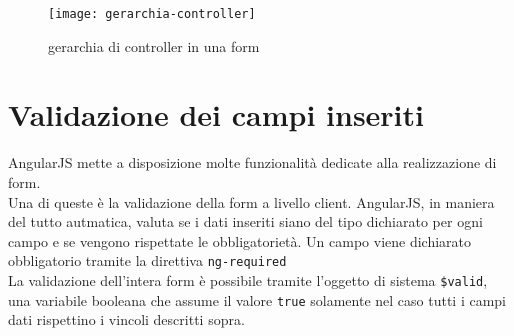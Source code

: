 	\begin{figure}[h]
	\centering
	\texttt{[image: gerarchia-controller]}
	\caption{gerarchia di controller in una form}
	\label{fig:ger-contr}
\end{figure}

\section{Validazione dei campi inseriti}

AngularJS mette a disposizione molte funzionalità dedicate alla realizzazione di form.\\
Una di queste è la validazione della form a livello client. AngularJS, in maniera del tutto autmatica, valuta se i dati inseriti siano del tipo dichiarato per ogni campo e se vengono rispettate le obbligatorietà. Un campo viene dichiarato obbligatorio tramite la direttiva \lstinline[language=HTML]!ng-required! \\
La validazione dell'intera form è possibile tramite l'oggetto di sistema \lstinline[language=HTML]!$valid!, una variabile booleana che assume il valore \lstinline[language=HTML]!true! solamente nel caso tutti i campi dati rispettino i vincoli descritti sopra.

\newpage
